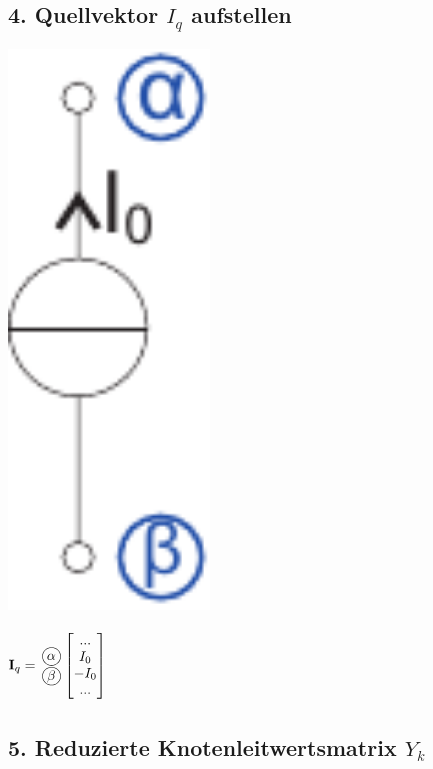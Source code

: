 \documentclass[a4paper,twocolumn,10pt]{article}
\newcommand*\kreis[1]{\unitlength1ex\begin{picture}(2.5,2.5)%
\put(0.75,0.75){\circle{3}}\put(0.7,0.7){\makebox(0,0){#1}}\end{picture}}
\begin{document}
\subsection*{4. Quellvektor $I_q$ aufstellen}
\begin{minipage}[b]{0.10\textwidth}
\includegraphics[width=0.4\textwidth]{img/KSA_Stromquelle}
\end{minipage}
\hfill
\begin{minipage}[b]{0.30\textwidth}
$\textbf{I}_q=\;\;\begin{matrix} \; \\ \kreis{$\alpha$} \\ \kreis{$\beta$} \\ \; \end{matrix} \left[\begin{matrix} ... \\ I_0 \\ -I_0 \\ ... \end{matrix}\right]$\\
\end{minipage}

\subsection*{5. Reduzierte Knotenleitwertsmatrix $Y_k$}
\end{document}
